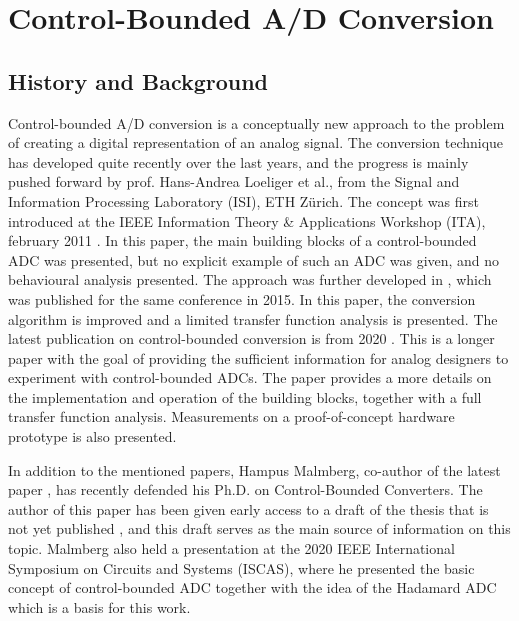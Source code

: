 
\chapter{Control-Bounded A/D Conversion}
\label{sec:cbadc}
\section{History and Background}
Control-bounded A/D conversion is a conceptually new approach to the problem of creating a digital representation of an analog signal. The conversion technique has developed quite recently over the last years, and the progress is mainly pushed forward by prof. Hans-Andrea Loeliger et al., from the Signal and Information Processing Laboratory (ISI), ETH Zürich. The concept was first introduced at the IEEE Information Theory \& Applications Workshop (ITA), february 2011 \cite{cbc_2011_loeliger}. In this paper, the main building blocks of a control-bounded ADC was presented, but no explicit example of such an ADC was given, and no behavioural analysis presented. The approach was further developed in \cite{cbc_2015_loeliger}, which was published for the same conference in 2015. In this paper, the conversion algorithm is improved and a limited transfer function analysis is presented. The latest publication on control-bounded conversion is from 2020 \cite{cbc_2020_loeliger}. This is a longer paper with the goal of providing the sufficient information for analog designers to experiment with control-bounded ADCs. The paper provides a more details on the implementation and operation of the building blocks, together with a full transfer function analysis. Measurements on a proof-of-concept hardware prototype is also presented.

In addition to the mentioned papers, Hampus Malmberg, co-author of the latest paper \cite{cbc_2020_loeliger}, has recently defended his Ph.D. on Control-Bounded Converters. The author of this paper has been given early access to a draft of the thesis that is not yet published \cite{malmberg_thesis}, and this draft serves as the main source of information on this topic. Malmberg also held a presentation at the 2020 IEEE International Symposium on Circuits and Systems (ISCAS)\cite{malmberg_talk}, where he presented the basic concept of control-bounded ADC together with the idea of the Hadamard ADC which is a basis for this work.

